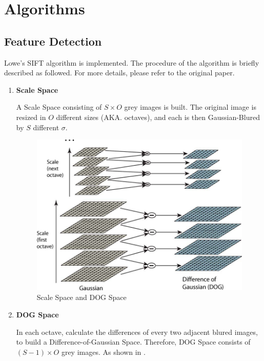 
\section{Algorithms}
\subsection{Feature Detection}
Lowe's SIFT algorithm\cite{sift} is implemented.
The procedure of the algorithm is briefly described as followed. For more details, please refer to the original paper.
\begin{enumerate}
  \item \textbf{Scale Space}

    A Scale Space consisting of $ S \times O$ grey images is built.
    The original image is resized in $ O$ different sizes (AKA. octaves), and each is then Gaussian-Blured
    by $ S$ different $ \sigma$.
    \begin{figure}[H]
      \centering
      \includegraphics[scale=0.35]{res/dog.jpg}
      \caption{Scale Space and DOG Space \label{fig:dog}}
    \end{figure}

  \item \textbf{DOG Space}

    In each octave, calculate the differences of every two adjacent blured images, to build a Difference-of-Gaussian Space.
    Therefore, DOG Space consists of $ (S - 1) \times O$ grey images.
    As shown in .


\end{enumerate}
